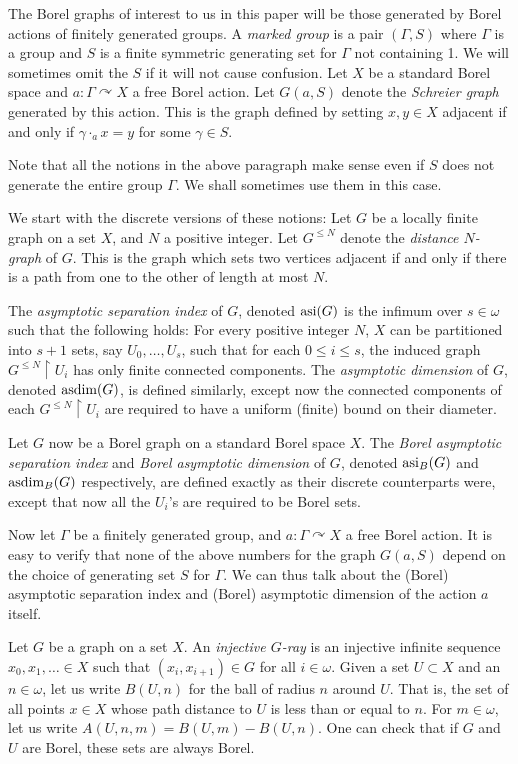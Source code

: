 \documentclass[10pt,a4paper]{article}
\newcommand{\0}{\varnothing}
\newcommand{\asdim}{\textnormal{asdim}}
\newcommand{\asi}{\textnormal{asi}}
\newcommand{\res}{\upharpoonright}
\begin{document}
The Borel graphs of interest to us in this paper will be those generated by Borel actions of finitely generated groups. A \textit{marked group} is a pair $(\Gamma,S)$ where $\Gamma$ is a group and $S$ is a finite symmetric generating set for $\Gamma$ not containing 1. We will sometimes omit the $S$ if it will not cause confusion. Let $X$ be a standard Borel space and $a:\Gamma \curvearrowright X$ a free Borel action. Let $G(a,S)$ denote the \textit{Schreier graph} generated by this action. This is the graph defined by setting $x,y \in X$ adjacent if and only if $\gamma \cdot_a x = y$ for some $\gamma \in S$.

Note that all the notions in the above paragraph make sense even if $S$ does not generate the entire group $\Gamma$. We shall sometimes use them in this case.

We start with the discrete versions of these notions: Let $G$ be a locally finite graph on a set $X$, and $N$ a positive integer. Let $G^{\leq N}$ denote the \textit{distance $N$-graph} of $G$. This is the graph which sets two vertices adjacent if and only if there is a path from one to the other of length at most $N$.

The \textit{asymptotic separation index} of $G$, denoted $\asi(G)$ is the infimum over $s \in \omega$ such that the following holds: For every positive integer $N$, $X$ can be partitioned into $s+1$ sets, say $U_0,\ldots,U_s$, such that for each $0 \leq i \leq s$, the induced graph $G^{\leq N} \res U_i$ has only finite connected components. The \textit{asymptotic dimension} of $G$, denoted $\asdim(G)$, is defined similarly, except now the connected components of each $G^{\leq N} \res U_i$ are required to have a uniform (finite) bound on their diameter. 

 Let $G$ now be a Borel graph on a standard Borel space $X$. The \textit{Borel asymptotic separation index} and \textit{Borel asymptotic dimension} of $G$, denoted $\asi_B(G)$ and $\asdim_B(G)$ respectively, are defined exactly as their discrete counterparts were, except that now all the $U_i$'s are required to be Borel sets.
 
 Now let $\Gamma$ be a finitely generated group, and $a:\Gamma \curvearrowright X$ a free Borel action. It is easy to verify that none of the above numbers for the graph $G(a,S)$ depend on the choice of generating set $S$ for $\Gamma$. We can thus talk about the (Borel) asymptotic separation index and (Borel) asymptotic dimension of the action $a$ itself.

Let $G$ be a graph on a set $X$. An \textit{injective $G$-ray} is an injective infinite sequence $x_0,x_1,\ldots \in X$ such that $(x_i,x_{i+1}) \in G$ for all $i \in \omega$. Given a set $U \subset X$ and an $n \in \omega$, let us write $B(U,n)$ for the ball of radius $n$ around $U$. That is, the set of all points $x \in X$ whose path distance to $U$ is less than or equal to $n$. For $m \in \omega$, let us write $A(U,n,m) = B(U,m)-B(U,n)$. One can check that if $G$ and $U$ are Borel, these sets are always Borel.
\end{document}
